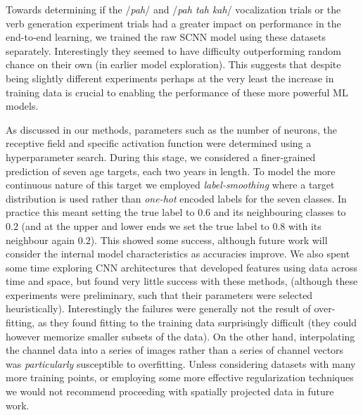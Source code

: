\documentclass[fleqn,10pt]{wlscirep}
\begin{document}
Towards determining if the /{\em pah}/ and /{\em pah tah kah}/ vocalization trials or the verb generation experiment trials had a greater impact on performance in the end-to-end learning, we trained the raw SCNN model using these datasets separately. Interestingly they seemed to have difficulty outperforming random chance on their own (in earlier model exploration). This suggests that despite being slightly different experiments perhaps at the very least the increase in training data is crucial to enabling the performance of these more powerful ML models.

As discussed in our methods, parameters such as the number of neurons, the receptive field and specific activation function were determined using a hyperparameter search. During this stage, we considered a finer-grained prediction of seven age targets, each two years in length. To model the more continuous nature of this target we employed {\em label-smoothing} \cite{Pereyra2017} where a target distribution is used rather than {\em one-hot} encoded labels for the seven classes. In practice this meant setting the true label to $0.6$ and its neighbouring classes to $0.2$ (and at the upper and lower ends we set the true label to $0.8$ with its neighbour again $0.2$). This showed some success, although future work will consider the internal model characteristics as accuracies improve. We also spent some time exploring CNN architectures that developed features using data across time and space, but found very little success with these methods, (although these experiments were preliminary, such that their parameters were selected heuristically). Interestingly the failures were generally not the result of over-fitting, as they found fitting to the training data surprisingly difficult (they could however memorize smaller subsets of the data). On the other hand, interpolating the channel data into a series of images rather than a series of channel vectors was {\em particularly} susceptible to overfitting. Unless considering datasets with many more training points, or employing some more effective regularization techniques we would not recommend proceeding with spatially projected data in future work. 
\end{document}
